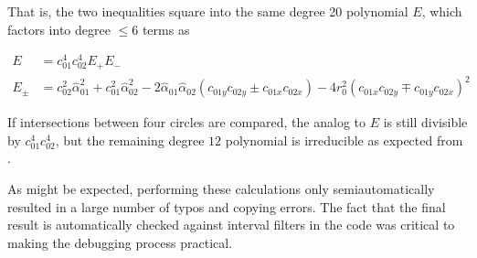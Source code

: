 \documentclass[11pt]{article}
\newcommand{\halpha}{\hat{\alpha}}
\begin{document}
That is, the two inequalities square into the same degree 20 polynomial $E$, which factors into degree $\le 6$ terms as
\begin{linenomath*}
\begin{align*}
E &= c_{01}^4 c_{02}^4 E_+ E_- \\
E_\pm &= c_{02}^2 \halpha_{01}^2 + c_{01}^2 \halpha_{02}^2 - 2 \halpha_{01} \halpha_{02} (c_{01y} c_{02y} \pm c_{01x} c_{02x}) - 4 r_0^2 (c_{01x} c_{02y} \mp c_{01y} c_{02x})^2
\end{align*}
\end{linenomath*}
If intersections between four circles are compared, the analog to $E$ is still divisible by $c_{01}^4 c_{02}^4$, but the remaining degree $12$ polynomial
is irreducible as expected from \cite{devillers2000algebraic}.

As might be expected, performing these calculations only semiautomatically resulted in a large number of typos and copying errors.  The fact that the final
result is automatically checked against interval filters in the code was critical to making the debugging process practical.
\end{document}
